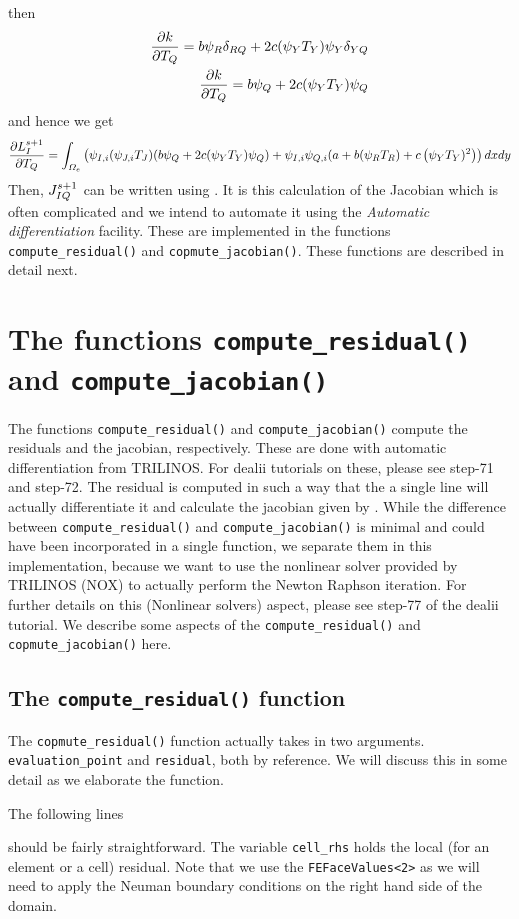 \documentclass[preprint,12pt]{elsarticle}
\newcommand{\te}[1]{\lstinline{#1}}
\numberwithin{equation}{section}
\begin{document}
then
\begin{eqnarray}
	\frac{\partial k}{\partial T_Q} = b\psi_R\delta_{RQ} + 2c  (\psi_Y T_Y) \psi_Y\delta_{YQ} \\
	\frac{\partial k}{\partial T_Q} = b\psi_Q + 2c  (\psi_Y T_Y) \psi_Q
\end{eqnarray}
and hence we get
\begin{equation}
	\frac{\partial L_I^{s+1}}{\partial T_Q} = \int_{\Omega_e} \left( \psi_{I,i} (\psi_{J,i}T_J)  (b\psi_Q + 2c  (\psi_Y T_Y) \psi_Q)   + \psi_{I,i}\psi_{Q,i}(a + b  (\psi_R T_R) + c \left( \psi_Y T_Y)^2 \right) \right)  dx dy 
\end{equation}
Then, $J_{IQ}^{s+1}$ can be written using . It is this calculation of the Jacobian which is often complicated and we intend to automate it using the \textit{Automatic differentiation} facility. These are implemented in the functions \te{compute_residual()} and \te{copmute_jacobian()}. These functions are described in detail next. 
\section{The functions \lstinline!compute_residual()! and \lstinline!compute_jacobian()!}
The functions \te{compute_residual()} and \te{compute_jacobian()} compute the residuals and the jacobian, respectively. These are done with automatic differentiation from TRILINOS. For dealii tutorials on these, please see step-71 and step-72. The residual is computed in such a way that the a single line will actually differentiate it and calculate the jacobian given by . While the difference between \te{compute_residual()} and \te{compute_jacobian()} is minimal and could have been incorporated in a single function, we separate them in this implementation, because we want to use the nonlinear solver provided by TRILINOS (NOX) to actually perform the Newton Raphson iteration. For further details on this (Nonlinear solvers) aspect, please see step-77 of the dealii tutorial. We describe some aspects of the \te{compute_residual()} and \te{copmute_jacobian()} here. 

\subsection{The  \te{compute_residual()} function}
The \te{copmute_residual()} function actually takes in two arguments. \te{evaluation_point} and \te{residual}, both by reference. We will discuss this in some detail as we elaborate the function. 

The following lines 

should be fairly straightforward. The variable \te{cell_rhs} holds the local (for an element or a cell) residual. Note that we use the \te{FEFaceValues<2>} as we will need to apply the Neuman boundary conditions on the right hand side of the domain. 
\end{document}
